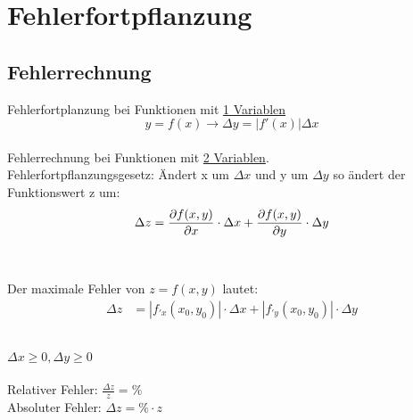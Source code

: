 



\chapter{Fehlerfortpflanzung}
\section{Fehlerrechnung}
Fehlerfortplanzung bei Funktionen mit \underline{1 Variablen}\\
	\[y=f(x) \rightarrow \Delta y = |f'(x)| \Delta x\]
\\
Fehlerrechnung  bei Funktionen mit \underline{2 Variablen}.\\
Fehlerfortpflanzungsgesetz:
Ändert x um $\Delta x$ und y um $\Delta y$ so ändert der Funktionswert z um:
\[ 
	\Delta z = \frac{\partial f(x,y)}{\partial x} \cdot \Delta x +  \frac{\partial f(x,y)}{\partial y} \cdot \Delta y
\]
\\
\\
Der maximale Fehler von $z=f(x,y)$ lautet:
\[
\boxed{\begin{aligned}	
	\Delta z&=\left| f_{'x}(x_0,y_0) \right| \cdot \Delta x+ \left|f_{'y}(x_0,y_0) \right| \cdot \Delta y	
\end{aligned}}\]
\\
\begin{footnotesize}
	$\Delta x \geqslant 0, \Delta y \geqslant 0$\\\\
Relativer Fehler: $\frac{\Delta z}{z}=\%$\\
Absoluter Fehler: $\Delta z=\%\cdot z $\\
\end{footnotesize}